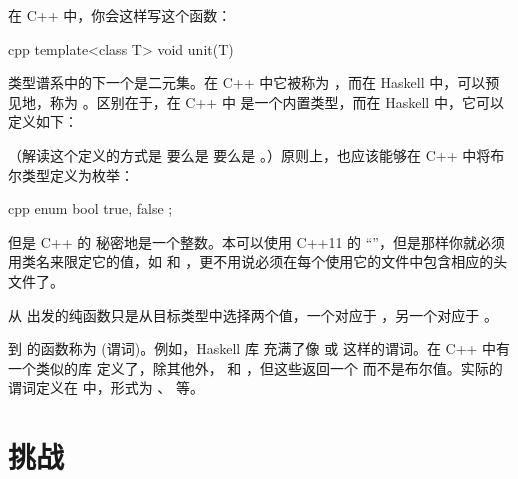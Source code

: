 在 C++ 中，你会这样写这个函数：

\begin{snip}{cpp}
template<class T>
void unit(T) {}
\end{snip}
类型谱系中的下一个是二元集。在 C++ 中它被称为 ，而在 Haskell 中，可以预见地，称为 。区别在于，在 C++ 中  是一个内置类型，而在 Haskell 中，它可以定义如下：

（解读这个定义的方式是  要么是  要么是 。）原则上，也应该能够在 C++ 中将布尔类型定义为枚举：

\begin{snip}{cpp}
enum bool {
    true,
    false
};
\end{snip}
但是 C++ 的  秘密地是一个整数。本可以使用 C++11 的 “”，但是那样你就必须用类名来限定它的值，如  和 ，更不用说必须在每个使用它的文件中包含相应的头文件了。

从  出发的纯函数只是从目标类型中选择两个值，一个对应于 ，另一个对应于 。

到  的函数称为  (谓词)。例如，Haskell 库  充满了像  或  这样的谓词。在 C++ 中有一个类似的库 \code{} 定义了，除其他外， 和 ，但这些返回一个  而不是布尔值。实际的谓词定义在  中，形式为 、 等。

\section{挑战}

